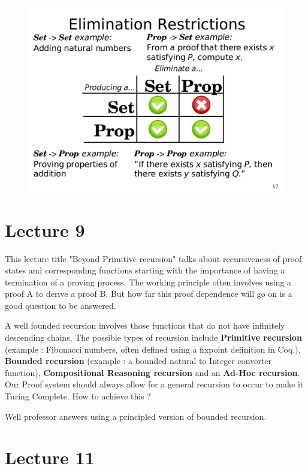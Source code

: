 \documentclass[paper=a4, fontsize=11pt]{scrartcl}
\numberwithin{equation}{section}		%
\numberwithin{figure}{section}			%
\numberwithin{table}{section}				%
\begin{document}
\begin{itemize}
{\begin{figure}[!htb]
\centering
  \includegraphics[width=\linewidth]{elim_restrict.png}
\end{figure}

}
\end{itemize}

\section{Lecture 9}
This lecture title "Beyond Primitive recursion" talks about recursiveness of proof states and corresponding functions starting with the importance of having a termination of a proving process. The working principle often involves using a proof A to derive a proof B. But how far this proof dependence will go on is a good question to be answered.

A well founded recursion involves those functions that do not have infinitely descending chains. The possible types of recursion include \textbf{Primitive recursion} (example : Fibonacci numbers, often defined using a fixpoint definition in Coq.), \textbf{Bounded recursion} (example : a bounded natural to Integer converter function), \textbf{Compositional Reasoning recursion} and an \textbf{Ad-Hoc recursion}. Our Proof system should always allow for a general recursion to occur to make it Turing Complete. How to achieve this ?

Well professor answers using a principled version of bounded recursion. 

\section{Lecture 11}
\end{document}
